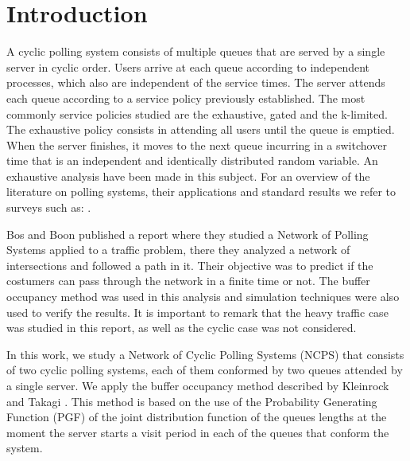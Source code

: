 %


\section{Introduction}

A cyclic polling system consists of multiple queues that are served by a single server in cyclic order. Users arrive at each queue according to independent processes, which also are independent of the service times. The server attends each queue according to a service policy previously established. The most commonly service policies studied are the exhaustive, gated and the k-limited. The exhaustive policy consists in attending all users until the queue is emptied. When the server finishes, it moves to the next queue incurring in a switchover time that is an independent and identically distributed random variable. An exhaustive analysis have been made in this subject. For an overview of the literature on polling systems, their applications and standard results we refer to surveys such as: \cite{Boxma, Kleinrock, LevySidi, Semenova, TakagiI, Takagi}. 

Bos and Boon \cite{BosBoon} published a report where they studied a Network of Polling Systems applied to a traffic problem, there they analyzed a network of intersections and followed a path in it. Their objective was to predict if the costumers can pass through the network in a finite time or not. The buffer occupancy method was used in this analysis and simulation techniques were also used to verify the results. It is important to remark that the heavy traffic case was studied in this report, as well as the cyclic case was not considered.

In this work, we study a Network of Cyclic Polling Systems (NCPS) that consists of two cyclic polling systems, each of them conformed by two queues attended by a single server. We apply the buffer occupancy method described by Kleinrock and Takagi \cite{TakagiI}. This method is based on the use of the Probability Generating Function (PGF) of the joint distribution function of the queues lengths at the moment the server starts a visit period in each of the queues that conform the system.

